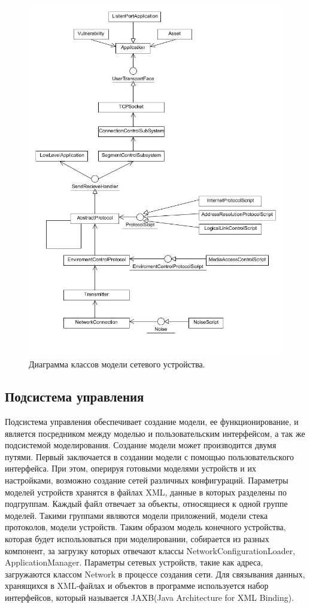 \documentclass[12pt]{report}
\begin{document}
    \begin{figure}[pH]\center
        \includegraphics[width = 140mm]{Ch3Pic9}
        \caption{Диаграмма классов модели сетевого устройства. } \label{Pic9}
    \end{figure}    

    \subsection{Подсистема управления}
    
    Подсистема управления обеспечивает создание модели, ее функционирование, и является посредником между моделью и пользовательским интерфейсом, а так же подсистемой моделирования. Создание модели может производится двумя путями. Первый заключается в создании модели с помощью пользовательского интерфейса. При этом, оперируя готовыми моделями устройств и их настройками, возможно создание сетей различных конфигураций. Параметры моделей устройств хранятся в файлах XML, данные в которых разделены по подгруппам. Каждый файл отвечает за объекты, относящиеся к одной группе моделей. Такими группами являются модели приложений, модели стека протоколов, модели устройств. Таким образом модель конечного устройства, которая будет использоваться при моделировании, собирается из разных компонент, за загрузку которых отвечают классы NetworkConfigurationLoader, ApplicationManager. Параметры сетевых устройств, такие как адреса, загружаются классом Network в процессе создания сети. Для связывания данных, хранящихся в XML-файлах и объектов в программе используется набор интерфейсов, который называется JAXB(Java Architecture for XML Binding).
    
\end{document}
